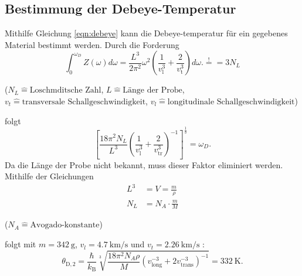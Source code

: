 \subsection{Bestimmung der Debeye-Temperatur}
Mithilfe Gleichung \ref{eqn:debeye} kann die Debeye-temperatur für ein gegebenes Material bestimmt werden.
Durch die Forderung
\begin{equation}
	\int_0^{\omega_D} Z(\omega)d\omega = \frac{L^3}{2\pi^2}\omega^2\left(\frac{1}{v_\text{l}^3}+\frac{2}{v_{\text{t}}^3}\right)d\omega. \overset{!}{=} = 3 N_L
	\label{eqn:z}
\end{equation}
\begin{center}
    \tiny{($N_L \hat{=} \text{Loschmditsche Zahl}$, $L \hat{=} \text{Länge der Probe}$, $v_t \hat{=} \text{transversale Schallgeschwindigkeit}$, $v_l \hat{=} \text{longitudinale Schallgeschwindigkeit}$)}
\end{center}
folgt
\begin{equation}
    \left[\frac{18\pi^2N_L}{L^3}\left(\frac{1}{v_\text{l}^3}+\frac{2}{v_\text{tr}^3}\right)^{-1} \right]^{\frac{1}{3}} = \omega_D.
\end{equation}
Da die Länge der Probe nicht bekannt, muss dieser Faktor eliminiert werden. Mithilfe der Gleichungen
\begin{align}
    L^3 &= V = \frac{m}{\rho} \\
    N_L &= N_A \cdot \frac{m}{M}
\end{align}
\begin{center}
    \tiny{($N_A \hat{=} \text{Avogado-konstante}$)}
\end{center}
folgt mit $m = \SI{342}{\gram} $, $v_l = \SI{4,7}{\kilo \meter \per \second} $ und $v_t = \SI{2,26}{\kilo \meter \per \second}$ :
\begin{equation}
    \theta_{\mathrm{D},2}=\frac{\hbar}{k_{\mathrm{B}}}\sqrt[3]{\frac{18\pi^2N_A\rho}{M}\left(v_{\mathrm{long}}^{-3}+2v_{\mathrm{trans}}^{-3}\right)^{-1}}=\SI{332}{\kelvin}.
\end{equation}

